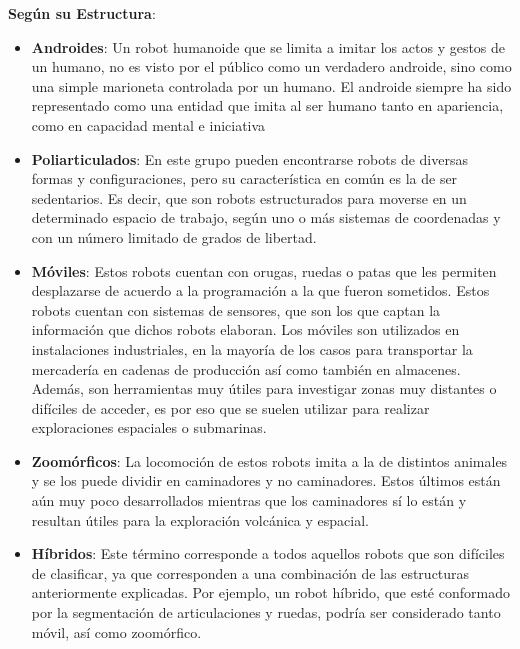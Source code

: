 \textbf{Según su Estructura}:
\begin{itemize}
\item \textbf{Androides}: Un robot humanoide que se limita a imitar los actos y gestos de un humano, no es visto por el público como un verdadero androide, sino como una simple marioneta controlada por un humano. El androide siempre ha sido representado como una entidad que imita al ser humano tanto en apariencia, como en capacidad mental e iniciativa

\item \textbf{Poliarticulados}: En este grupo pueden encontrarse robots de diversas formas y configuraciones, pero su característica en común es la de ser sedentarios. Es decir, que son robots estructurados para moverse en un determinado espacio de trabajo, según uno o más sistemas de coordenadas y con un número limitado de grados de libertad.

\item \textbf{Móviles}: Estos robots cuentan con orugas, ruedas o patas que les permiten desplazarse de acuerdo a la programación a la que fueron sometidos. Estos robots cuentan con sistemas de sensores, que son los que captan la información que dichos robots elaboran. Los móviles son utilizados en instalaciones industriales, en la mayoría de los casos para transportar la mercadería en cadenas de producción así como también en almacenes. Además, son herramientas muy útiles para investigar zonas muy distantes o difíciles de acceder, es por eso que se suelen utilizar para realizar exploraciones espaciales o submarinas.

\item \textbf{Zoomórficos}: La locomoción de estos robots imita a la de distintos animales y se los puede dividir en caminadores y no caminadores. Estos últimos están aún muy poco desarrollados mientras que los caminadores sí lo están y resultan útiles para la exploración volcánica y espacial.

\item \textbf{Híbridos}: Este término corresponde a todos aquellos robots que son difíciles de clasificar, ya que corresponden a una combinación de las estructuras anteriormente explicadas. Por ejemplo, un robot híbrido, que esté conformado por la segmentación de articulaciones y ruedas, podría ser considerado tanto móvil, así como zoomórfico.

\end{itemize}

